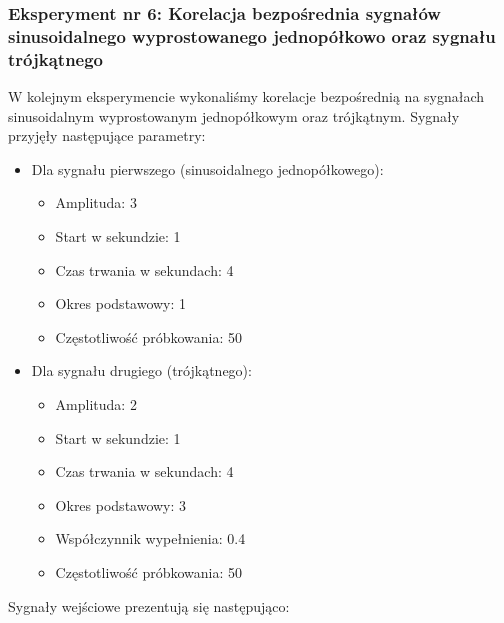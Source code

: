 \documentclass[12pt]{article}
\begin{document}

\subsubsection{Eksperyment nr 6: Korelacja bezpośrednia sygnałów sinusoidalnego wyprostowanego jednopółkowo oraz sygnału trójkątnego}

W kolejnym eksperymencie wykonaliśmy korelacje bezpośrednią na sygnałach sinusoidalnym wyprostowanym jednopółkowym oraz trójkątnym. Sygnały przyjęły następujące parametry:

\begin{itemize}
    \item Dla sygnału pierwszego (sinusoidalnego jednopółkowego): 
    \begin{itemize}
        \item Amplituda: 3
        \item Start w sekundzie: 1
        \item Czas trwania w sekundach: 4
        \item Okres podstawowy: 1
        \item Częstotliwość próbkowania: 50
    \end{itemize}
    \item Dla sygnału drugiego (trójkątnego):
    \begin{itemize}
        \item Amplituda: 2
        \item Start w sekundzie: 1
        \item Czas trwania w sekundach: 4
        \item Okres podstawowy: 3
        \item Współczynnik wypełnienia: 0.4
        \item Częstotliwość próbkowania: 50
    \end{itemize}
\end{itemize}
Sygnały wejściowe prezentują się następująco:
\end{document}

